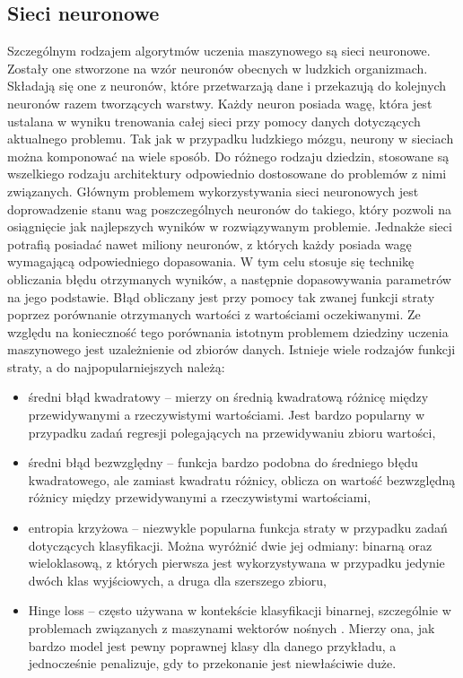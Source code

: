 \subsection{Sieci neuronowe}
Szczególnym rodzajem algorytmów uczenia maszynowego są sieci neuronowe. Zostały one stworzone na wzór neuronów obecnych w ludzkich organizmach. Składają się one z neuronów, które przetwarzają dane i przekazują do kolejnych neuronów razem tworzących warstwy. Każdy neuron posiada wagę, która jest ustalana w wyniku trenowania całej sieci przy pomocy danych dotyczących aktualnego problemu. Tak jak w przypadku ludzkiego mózgu, neurony w sieciach można komponować na wiele sposób. Do różnego rodzaju dziedzin, stosowane są wszelkiego rodzaju architektury odpowiednio dostosowane do problemów z nimi związanych. Głównym problemem wykorzystywania sieci neuronowych jest doprowadzenie stanu wag poszczególnych neuronów do takiego, który pozwoli na osiągnięcie jak najlepszych wyników w rozwiązywanym problemie. Jednakże sieci potrafią posiadać nawet miliony neuronów, z których każdy posiada wagę wymagającą odpowiedniego dopasowania. W tym celu stosuje się technikę obliczania błędu otrzymanych wyników, a następnie dopasowywania parametrów na jego podstawie. Błąd obliczany jest przy pomocy tak zwanej funkcji straty poprzez porównanie otrzymanych wartości z wartościami oczekiwanymi. Ze względu na konieczność tego porównania istotnym problemem dziedziny uczenia maszynowego jest uzależnienie od zbiorów danych. Istnieje wiele rodzajów funkcji straty, a do najpopularniejszych należą:
\begin{itemize}
  \item średni błąd kwadratowy -- mierzy on średnią kwadratową różnicę między przewidywanymi a rzeczywistymi wartościami. Jest bardzo popularny w przypadku zadań regresji polegających na przewidywaniu zbioru wartości,
  \item średni błąd bezwzględny -- funkcja bardzo podobna do średniego błędu kwadratowego, ale zamiast kwadratu różnicy, oblicza on wartość bezwzględną różnicy między przewidywanymi a rzeczywistymi wartościami,
  \item entropia krzyżowa -- niezwykle popularna funkcja straty w przypadku zadań dotyczących klasyfikacji. Można wyróżnić dwie jej odmiany: binarną oraz wieloklasową, z których pierwsza jest wykorzystywana w przypadku jedynie dwóch klas wyjściowych, a druga dla szerszego zbioru,
  \item Hinge loss -- często używana w kontekście klasyfikacji binarnej, szczególnie w problemach związanych z maszynami wektorów nośnych \cite{mammone2009support}. Mierzy ona, jak bardzo model jest pewny poprawnej klasy dla danego przykładu, a jednocześnie penalizuje, gdy to przekonanie jest niewłaściwie duże.
\end{itemize}
